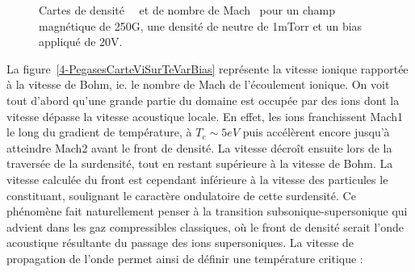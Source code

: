\begin{refsection}
\begin{figure}[!htbp] 
  \centering
    \caption{Cartes de densité~~ et de
    nombre de Mach~ pour un champ
    magnétique de 250G, une densité de neutre de 1mTorr et un bias appliqué de
    20V.}
    \label{4-PegasesVaguesIoniques}
\end{figure}
 
 La figure~\ref{4-PegasesCarteViSurTeVarBias} représente la vitesse ionique
 rapportée à la vitesse de Bohm, ie. le nombre de Mach de
 l'écoulement ionique. On voit tout d'abord qu'une grande partie du domaine est
 occupée par des ions dont la vitesse dépasse la vitesse acoustique locale. En
 effet, les ions franchissent Mach1 le long du gradient de température, à
 $T_e\sim 5eV$ puis accélèrent encore jusqu'à atteindre Mach2 avant le front de
 densité. La vitesse décroît ensuite lors de la traversée de la surdensité, tout
 en restant supérieure à la vitesse de Bohm. La vitesse calculée du
 front est cependant inférieure à la vitesse des particules le constituant,
 soulignant le caractère ondulatoire de cette surdensité. Ce phénomène fait
 naturellement penser à la transition subsonique-supersonique qui advient dans
 les gaz compressibles classiques, où le front de densité serait l'onde
 acoustique résultante du passage des ions supersoniques. La vitesse de
 propagation de l'onde permet ainsi de définir une température critique :
 

\end{refsection}
